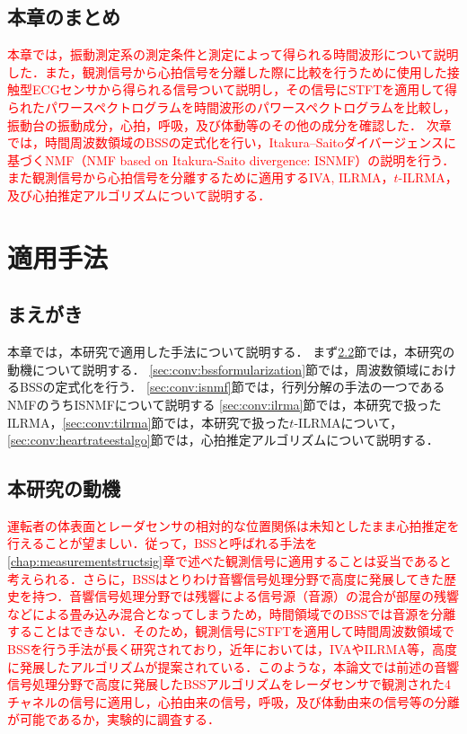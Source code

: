 \section{本章のまとめ}
\label{sec:conv:conclusion2}
\textcolor{red}{本章では，振動測定系の測定条件と測定によって得られる時間波形について説明した．また，観測信号から心拍信号を分離した際に比較を行うために使用した接触型ECGセンサから得られる信号ついて説明し，その信号にSTFTを適用して得られたパワースペクトログラムを時間波形のパワースペクトログラムを比較し，振動台の振動成分，心拍，呼吸，及び体動等のその他の成分を確認した．
次章では，時間周波数領域のBSSの定式化を行い，Itakura--Saitoダイバージェンスに基づくNMF（NMF based on Itakura-Saito divergence: ISNMF）の説明を行う．また観測信号から心拍信号を分離するために適用するIVA, ILRMA，$t$-ILRMA，及び心拍推定アルゴリズムについて説明する．}


\chapter{適用手法}
\label{chap:methods}

\section{まえがき}
本章では，本研究で適用した手法について説明する．
まず\ref{sec:conv:researchmotivation}節では，本研究の動機について説明する．
\ref{sec:conv:bssformularization}節では，周波数領域におけるBSSの定式化を行う．
\ref{sec:conv:isnmf}節では，行列分解の手法の一つであるNMFのうちISNMFについて説明する
\ref{sec:conv:ilrma}節では，本研究で扱ったILRMA，\ref{sec:conv:tilrma}節では，本研究で扱った$t$-ILRMAについて，\ref{sec:conv:heartrateestalgo}節では，心拍推定アルゴリズムについて説明する．

\section{本研究の動機}
\label{sec:conv:researchmotivation}
\textcolor{red}{運転者の体表面とレーダセンサの相対的な位置関係は未知としたまま心拍推定を行えることが望ましい．従って，BSSと呼ばれる手法を\ref{chap:measurementstructsig}章で述べた観測信号に適用することは妥当であると考えられる．さらに，BSSはとりわけ音響信号処理分野で高度に発展してきた歴史を持つ．音響信号処理分野では残響による信号源（音源）の混合が部屋の残響などによる畳み込み混合となってしまうため，時間領域でのBSSでは音源を分離することはできない．そのため，観測信号にSTFTを適用して時間周波数領域でBSSを行う手法が長く研究されており，近年においては，IVAやILRMA等，高度に発展したアルゴリズムが提案されている．このような，本論文では前述の音響信号処理分野で高度に発展したBSSアルゴリズムをレーダセンサで観測された4チャネルの信号に適用し，心拍由来の信号，呼吸，及び体動由来の信号等の分離が可能であるか，実験的に調査する．}

